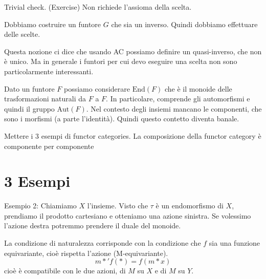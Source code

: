 \documentclass[a4paper]{article}
\begin{document}
\begin{snippetproof}{}
    \begin{iffproof}
        \item Trivial check. (Exercise) Non richiede l'assioma della scelta.
        \item Dobbiamo costruire un funtore \(G\) che sia un inverso.
        Quindi dobbiamo effettuare delle scelte.
    \end{iffproof}
\end{snippetproof}

Questa nozione ci dice che usando AC possiamo definire un quasi-inverso,
che non è unico. Ma in generale i funtori per cui devo eseguire una scelta non sono
particolarmente interessanti.


Dato un funtore \(F\) possiamo considerare \(\text{End}(F)\)
che è il monoide delle trasformazioni naturali da \(F\) a \(F\).
In particolare, comprende gli automorfismi e quindi il gruppo
\(\text{Aut}(F)\). Nel contesto degli insiemi mancano
le componenti, che sono i morfismi (a parte l'identità).
Quindi questo contetto diventa banale.

Mettere i 3 esempi di functor categories.
La composizione della functor category è componente per componente


\section{3 Esempi}

Esempio 2:
Chiamiamo \(X\) l'insieme.
Visto che \(\tau\) è un endomorfismo di \(X\), prendiamo il prodotto
cartesiano e otteniamo una azione sinistra.
Se volessimo l'azione destra potremmo prendere il duale del monoide.

La condizione di naturalezza corrisponde con
la condizione che \(f\) sia una funzione equivariante, cioè rispetta
l'azione (M-equivariante).
\[
    m \ast' f(\ast) = f(m \ast x)
\]
cioè è compatibile con le due azioni,
di \(M\) su \(X\) e di \(M\) su \(Y\).
\end{document}
